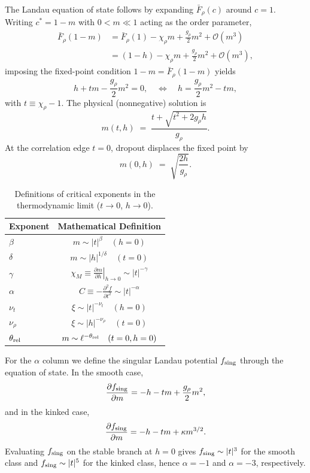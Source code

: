 \documentclass{article}
\theoremstyle{plain}
\theoremstyle{definition}
\theoremstyle{remark}
\begin{document}
The Landau equation of state follows by expanding \(\bar F_\rho(c)\) around \(c=1\). Writing \(c^*=1-m\) with \(0<m\ll 1\) acting as the order parameter,
\relax
\begin{align}
\bar F_\rho(1-m)&=\bar F_\rho(1)-\chi_\rho m+\frac{g_\rho}{2}m^2+\mathcal O(m^3)\\
&=(1-h)-\chi_\rho m+\frac{g_\rho}{2}m^2+\mathcal O(m^3),
\end{align}
\relax
 imposing the fixed-point condition \(1-m=\bar F_\rho(1-m)\) yields
\relax
\begin{equation}
h + t m - \frac{g_\rho}{2} m^2 = 0, \quad\Longleftrightarrow\quad h = \frac{g_\rho}{2} m^2 - t m,
\label{eq:EoS_correct}
\end{equation}
\relax
with \(t\equiv \chi_\rho-1\). The physical (nonnegative) solution is
\relax
\begin{equation}
m(t,h) \;=\; \frac{t + \sqrt{t^2 + 2 g_\rho h}}{g_\rho}.
\label{eq:m_smooth_solution}
\end{equation}
\relax
At the correlation edge \(t=0\), dropout displaces the fixed point by
\relax
\begin{equation}
m(0,h) \;=\; \sqrt{\frac{2h}{g_\rho}}.
\label{eq:m_at_edge}
\end{equation}
\relax
\begin{table}[h]
\caption{Definitions of critical exponents in the thermodynamic limit ($t \to 0$, $h \to 0$).}
\label{tab:math_exponents}
\centering
\renewcommand{\arraystretch}{1.8}
\begin{tabular}{lc}
\toprule
Exponent & Mathematical Definition \\
\midrule
$\beta$ & $m \sim |t|^\beta \quad (h=0)$ \\
$\delta$ & $m \sim |h|^{1/\delta} \quad (t=0)$ \\
$\gamma$ & $\chi_M \equiv \left. \frac{\partial m}{\partial h} \right|_{h \to 0} \sim |t|^{-\gamma}$ \\
$\alpha$ & $C \equiv -\frac{\partial^2 f}{\partial t^2} \sim |t|^{-\alpha}$ \\
$\nu_t$ & $\xi \sim |t|^{-\nu_t} \quad (h=0)$ \\
$\nu_\rho$ & $\xi \sim |h|^{-\nu_\rho} \quad (t=0)$ \\
$\theta_{\rm rel}$ & $m \sim \ell^{-\theta_{\rm rel}} \quad (t=0, h=0)$ \\
\bottomrule
\end{tabular}
\end{table}

For the \(\alpha\) column we define the singular Landau potential \(f_{\rm sing}\) through the equation of state. In the smooth case,
\relax
\begin{equation}
\frac{\partial f_{\rm sing}}{\partial m} = -h-tm+\frac{g_\rho}{2}m^2,
\end{equation}
\relax
and in the kinked case,
\relax
\begin{equation}
\frac{\partial f_{\rm sing}}{\partial m} = -h-tm+\kappa m^{3/2}.
\end{equation}
\relax
Evaluating \(f_{\rm sing}\) on the stable branch at \(h=0\) gives \(f_{\rm sing}\sim |t|^3\) for the smooth class and \(f_{\rm sing}\sim |t|^5\) for the kinked class, hence \(\alpha=-1\) and \(\alpha=-3\), respectively.
\end{document}
